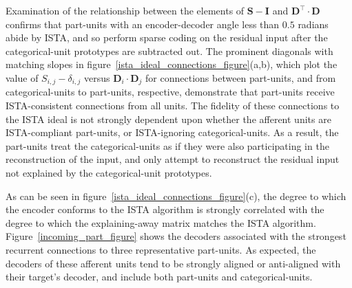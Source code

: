 \documentclass{article} %
\newcommand{\D}{\mathbf{D}}
\newcommand{\E}{\mathbf{E}}
\newcommand{\I}{\mathbf{I}}
\newcommand{\Sm}{\mathbf{S}}
\begin{document}
Examination of the relationship between the elements of $\Sm - \I$ and $\D^{\top} \cdot \D$ confirms that part-units with an encoder-decoder angle less than $0.5$ radians abide by ISTA, and so perform sparse coding on the residual input after the categorical-unit prototypes are subtracted out.  
The prominent diagonals with matching slopes in figure~\ref{ista_ideal_connections_figure}(a,b), which plot the value of $S_{i,j} - \delta_{i,j}$ versus $\D_i \cdot \D_j$ for connections between part-units, and from categorical-units to part-units, respective, demonstrate that part-units receive ISTA-consistent connections from all units.  The fidelity of these connections to the ISTA ideal is not strongly dependent upon whether the afferent units are ISTA-compliant part-units, or ISTA-ignoring categorical-units.  As a result, the part-units treat the categorical-units as if they were also participating in the reconstruction of the input, and only attempt to reconstruct the residual input not explained by the categorical-unit prototypes.  

As can be seen in figure~\ref{ista_ideal_connections_figure}(c), the degree to which the encoder conforms to the ISTA algorithm is strongly correlated with the degree to which the explaining-away matrix matches the ISTA algorithm.  Figure~\ref{incoming_part_figure} shows the decoders associated with the strongest recurrent connections to three representative part-units.  As expected, the decoders of these afferent units tend to be strongly aligned or anti-aligned with their target's decoder, and include both part-units and categorical-units.
\end{document}
